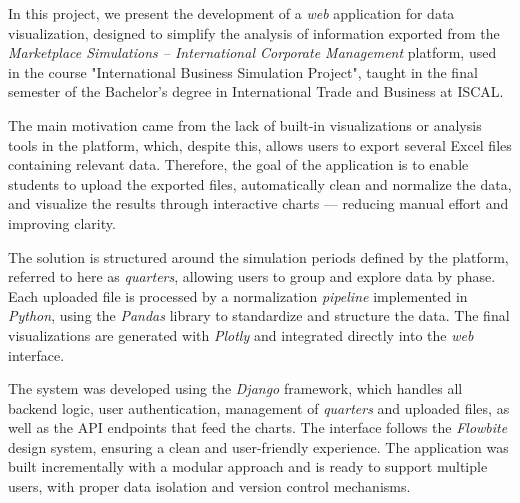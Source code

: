 
In this project, we present the development of a \textit{web} application for data visualization, designed to simplify the analysis of information exported from the \textit{Marketplace Simulations – International Corporate Management} platform, used in the course "International Business Simulation Project", taught in the final semester of the Bachelor's degree in International Trade and Business at ISCAL.

The main motivation came from the lack of built-in visualizations or analysis tools in the platform, which, despite this, allows users to export several Excel files containing relevant data. Therefore, the goal of the application is to enable students to upload the exported files, automatically clean and normalize the data, and visualize the results through interactive charts — reducing manual effort and improving clarity.

The solution is structured around the simulation periods defined by the platform, referred to here as \textit{quarters}, allowing users to group and explore data by phase. Each uploaded file is processed by a normalization \textit{pipeline} implemented in \textit{Python}, using the \textit{Pandas} library to standardize and structure the data. The final visualizations are generated with \textit{Plotly} and integrated directly into the \textit{web} interface.

The system was developed using the \textit{Django} framework, which handles all backend logic, user authentication, management of \textit{quarters} and uploaded files, as well as the API endpoints that feed the charts. The interface follows the \textit{Flowbite} design system, ensuring a clean and user-friendly experience. The application was built incrementally with a modular approach and is ready to support multiple users, with proper data isolation and version control mechanisms.